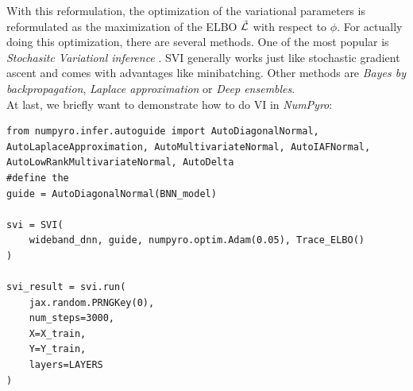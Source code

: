 \documentclass{article}
\begin{document}
With this reformulation, the optimization of the variational parameters is reformulated as the maximization of the ELBO $\Tilde{\mathcal{L}}$ with respect to $\phi$. For actually doing this optimization, there are several methods. One of the most popular is \textit{Stochasitc Variationl inference} \cite{hoffman2013stochasticvariationalinference}. SVI generally works just like stochastic gradient ascent \cite{BNNTut} and comes with advantages like minibatching. Other methods are \textit{Bayes by backpropagation}, \textit{Laplace approximation} or \textit{Deep ensembles}.\\
At last, we briefly want to demonstrate how to do VI in \textit{NumPyro}:
\begin{lstlisting}[caption= {Inference with VI},captionpos=t]
from numpyro.infer.autoguide import AutoDiagonalNormal, AutoLaplaceApproximation, AutoMultivariateNormal, AutoIAFNormal, AutoLowRankMultivariateNormal, AutoDelta
#define the 
guide = AutoDiagonalNormal(BNN_model)

svi = SVI(
    wideband_dnn, guide, numpyro.optim.Adam(0.05), Trace_ELBO()
)

svi_result = svi.run(
    jax.random.PRNGKey(0),
    num_steps=3000,
    X=X_train,
    Y=Y_train,
    layers=LAYERS
)
\end{lstlisting}
\end{document}
